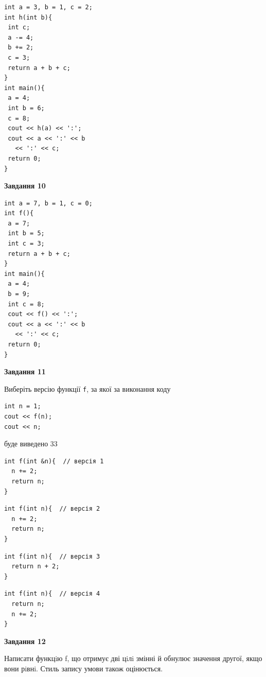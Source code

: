 \documentclass[12pt, ukrainian]{article}
\def\code#1{\Verb!#1!}
\begin{document}
{\begin {large}
\begin{minipage}[t]{7.0cm}
\begin{verbatim}
int a = 3, b = 1, c = 2;
int h(int b){
 int c;
 a -= 4;
 b += 2;
 c = 3;
 return a + b + c;
}
int main(){
 a = 4;
 int b = 6;
 c = 8;
 cout << h(a) << ':';
 cout << a << ':' << b 
   << ':' << c;
 return 0;
}
\end{verbatim}



\begin{center}
\textbf{Завдання 10}
\end{center}
\vspace{-8mm}

\begin{verbatim}
int a = 7, b = 1, c = 0;
int f(){
 a = 7;
 int b = 5;
 int c = 3;
 return a + b + c;
}
int main(){
 a = 4;
 b = 9;
 int c = 8;
 cout << f() << ':';
 cout << a << ':' << b 
   << ':' << c;
 return 0;
}
\end{verbatim}

\end{minipage}
\vline \hspace{1mm}
\begin{minipage}[t]{11.0cm}

\begin{center}
\textbf{Завдання 11}
\end{center}
Виберіть версію функції \code{f}, за якої за виконання коду
\begin{verbatim}
int n = 1;
cout << f(n);
cout << n;
\end{verbatim}

буде виведено 33

\begin{verbatim}
int f(int &n){  // версія 1
  n += 2;
  return n;
}
\end{verbatim}

\vspace{-8mm}\begin{verbatim}
int f(int n){  // версія 2
  n += 2;
  return n;
}
\end{verbatim}

\vspace{-8mm}\begin{verbatim}
int f(int n){  // версія 3
  return n + 2;
}
\end{verbatim}

\vspace{-8mm}\begin{verbatim}
int f(int n){  // версія 4
  return n;
  n += 2;
}
\end{verbatim}



\begin{center}
\textbf{Завдання 12}
\end{center}

Написати функцiю f, що отримує дві цiлi змінні й обнулює значення другої, якщо вони рiвнi. Стиль запису умови також оцінюється.\par

\end{minipage}

\end {large}}
\newpage
\end{document}
